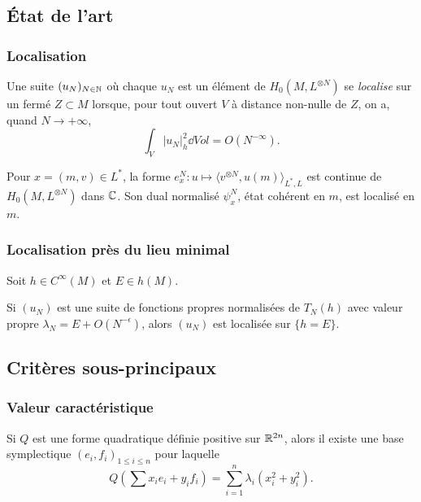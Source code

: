 \documentclass[mathserif]{beamer}
\begin{document}
\subsection{\'Etat de l'art}
\begin{frame}
  \frametitle{Localisation}
  \begin{defn}
    Une suite $(u_N)_{N\in \mathbb{N}}$ où chaque $u_N$ est un élément de
    $H_0(M,L^{\otimes N})$ se \emph{localise} sur un fermé $Z\subset
    M$ lorsque, pour tout ouvert $V$ à distance non-nulle de $Z$, on
    a, quand $N\to +\infty$,
    \[
      \int_V |u_N|^2_h\dd Vol=O(N^{-\infty}).
    \]
  \end{defn}
  \begin{ex}
    Pour $x=(m,v)\in L^*$, la forme $e_x^N:u\mapsto
    \langle v^{\otimes N},u(m)\rangle_{L^*,L}$ est continue de $H_0(M,L^{\otimes N})$ dans $\mathbb{C}$. Son dual
    normalisé $\psi_x^N$, état cohérent en $m$, est localisé en $m$.
  \end{ex}
\end{frame}

\begin{frame}
  \frametitle{Localisation près du lieu minimal}
  \begin{prop}[D.]
    Soit $h\in C^{\infty}(M)$ et $E\in h(M)$.

    Si $(u_N)$ est une suite de fonctions propres normalis\'ees de
    $T_N(h)$ avec valeur propre $\lambda_N=E+O(N^{-\epsilon})$, alors $(u_N)$ est
    localisée sur $\{h=E\}$.
  \end{prop}
\end{frame}

\subsection{Critères sous-principaux}
\begin{frame}
  \frametitle{Valeur caractéristique}
  Si $Q$ est une forme quadratique définie positive sur $\mathbb{R}^{2n}$,
  alors il existe une base symplectique $(e_i,f_i)_{1\leq i \leq n}$
  pour laquelle
  \[
    Q\left(\sum x_ie_i+y_if_i\right)=\sum_{i=1}^n \lambda_i(x_i^2+y_i^2).
  \]
\end{frame}
\end{document}

